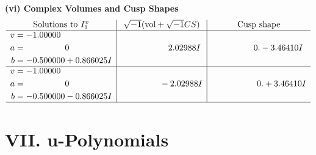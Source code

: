 \documentclass[1p]{elsarticle_modified}
\theoremstyle{definition}
\newcommand{\I}{\sqrt{-1}}
\begin{document}
\newpage\flushleft \textbf{(vi) Complex Volumes and Cusp Shapes}
$$\begin{array}{c|c|c}  
\text{Solutions to }I^v_{1}& \I (\text{vol} + \sqrt{-1}CS) & \text{Cusp shape}\\
 \hline 
\begin{aligned}
v &= -1.00000\phantom{ +0.000000I} \\
a &= \phantom{-0.000000 } 0 \\
b &= -0.500000 + 0.866025 I\end{aligned}
 & \phantom{-0.000000 -}2.02988 I & \phantom{-0.000000 } 0. - 3.46410 I \\ \hline\begin{aligned}
v &= -1.00000\phantom{ +0.000000I} \\
a &= \phantom{-0.000000 } 0 \\
b &= -0.500000 - 0.866025 I\end{aligned}
 & \phantom{-0.000000 } -2.02988 I & \phantom{-0.000000 -}0. + 3.46410 I\\
 \hline 
 \end{array}$$\newpage
\newpage\renewcommand{\arraystretch}{1}
\centering \section*{ VII. u-Polynomials}
\end{document}
